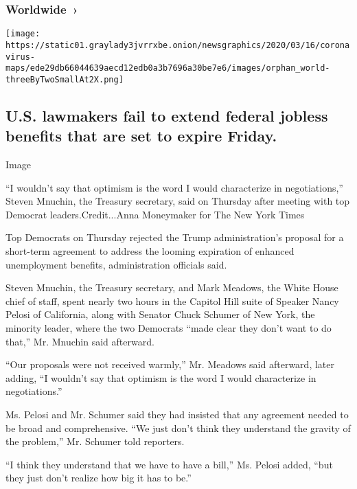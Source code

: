 \href{https://www.nytimes3xbfgragh.onion/interactive/2020/world/coronavirus-maps.html}{}

\hypertarget{worldwide-}{%
\subsubsection{Worldwide~›}\label{worldwide-}}

\texttt{[image: https://static01.graylady3jvrrxbe.onion/newsgraphics/2020/03/16/coronavirus-maps/ede29db66044639aecd12edb0a3b7696a30be7e6/images/orphan\_world-threeByTwoSmallAt2X.png]}

\hypertarget{us-lawmakers-fail-to-extend-federal-jobless-benefits-that-are-set-to-expire-friday}{%
\subsection{U.S. lawmakers fail to extend federal jobless benefits that
are set to expire
Friday.}\label{us-lawmakers-fail-to-extend-federal-jobless-benefits-that-are-set-to-expire-friday}}

Image

``I wouldn't say that optimism is the word I would characterize in
negotiations,'' Steven Mnuchin, the Treasury secretary, said on Thursday
after meeting with top Democrat leaders.Credit...Anna Moneymaker for The
New York Times

Top Democrats on Thursday rejected the Trump administration's proposal
for a short-term agreement to address the looming expiration of enhanced
unemployment benefits, administration officials said.

Steven Mnuchin, the Treasury secretary, and Mark Meadows, the White
House chief of staff, spent nearly two hours in the Capitol Hill suite
of Speaker Nancy Pelosi of California, along with Senator Chuck Schumer
of New York, the minority leader, where the two Democrats ``made clear
they don't want to do that,'' Mr. Mnuchin said afterward.

``Our proposals were not received warmly,'' Mr. Meadows said afterward,
later adding, ``I wouldn't say that optimism is the word I would
characterize in negotiations.''

Ms. Pelosi and Mr. Schumer said they had insisted that any agreement
needed to be broad and comprehensive. ``We just don't think they
understand the gravity of the problem,'' Mr. Schumer told reporters.

``I think they understand that we have to have a bill,'' Ms. Pelosi
added, ``but they just don't realize how big it has to be.''

